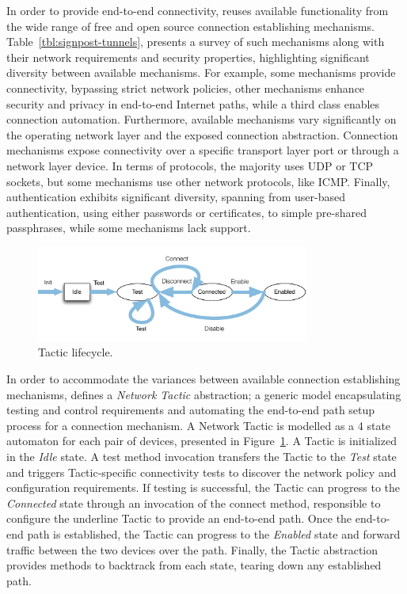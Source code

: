 In order to provide end-to-end connectivity, \signpost reuses available
functionality from the wide range of free and open source connection
establishing mechanisms. Table~\ref{tbl:signpost-tunnels}, presents a survey of
such mechanisms along with their network requirements and security properties,
highlighting significant diversity between available mechanisms.  For example,
some mechanisms provide connectivity, bypassing strict network policies,  other
mechanisms enhance security and privacy in end-to-end Internet paths, while a
third class enables connection automation.  Furthermore, available mechanisms
vary significantly on the operating network layer and the exposed connection
abstraction. Connection mechanisms expose connectivity over a specific transport
layer port or through a network layer device.  In terms of protocols, the
majority uses UDP or TCP sockets, but some mechanisms use other network
protocols, like ICMP\@.  Finally, authentication exhibits significant diversity,
spanning from user-based authentication, using either passwords or certificates,
to simple pre-shared passphrases, while some mechanisms lack support. 

\begin{figure}
  \begin{center}
	\includegraphics[width=0.8\textwidth]{Chapter3/Chapter3Figs/signpost-tactic}
  \end{center}
  \caption{\signpost Tactic lifecycle.}
  \label{fig:signpost-tactic}
\end{figure}

In order to accommodate the variances between available connection establishing
mechanisms, \signpost defines a \textit{Network Tactic} abstraction; a generic
model encapsulating testing and control requirements and automating the
end-to-end path setup process for a connection mechanism.  A Network Tactic is
modelled as a 4 state automaton for each pair of devices, presented in
Figure~\ref{fig:signpost-tactic}.  A Tactic is initialized in the \emph{Idle}
state.  A test method invocation transfers the Tactic to the \emph{Test} state
and triggers Tactic-specific connectivity tests to discover the network policy
and configuration requirements.  If testing is successful, the Tactic can
progress to the \emph{Connected} state through an invocation of the connect
method, responsible to configure the underline Tactic to provide an end-to-end
path. Once the end-to-end path is established, the Tactic can progress to the
\emph{Enabled} state and forward traffic between the two devices over the path.
Finally, the Tactic abstraction provides methods to backtrack from each state,
tearing down any established path. 


